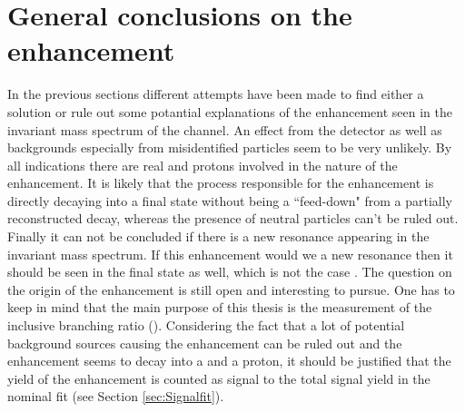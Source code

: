\section{General conclusions on the enhancement}
In the previous sections different attempts have been made to find either a solution or rule out some potantial explanations of the enhancement seen in the invariant \Dz\proton mass spectrum of the \LbToDpmunuX channel.
An effect from the detector as well as backgrounds especially from misidentified particles seem to be very unlikely.
By all indications there are real \Dz and protons involved in the nature of the enhancement.
It is likely that the process responsible for the enhancement is directly decaying into a \Dz\proton final state without being a ``feed-down" from a partially reconstructed decay, whereas the presence of neutral particles can't be ruled out.
Finally it can not be concluded if there is a new resonance appearing in the invariant \Dz\proton mass spectrum.
If this enhancement would we a new \Lc resonance then it should be seen in the \Lc\pip\pim final state as well, which is not the case \cite{PDG}.
The question on the origin of the enhancement is still open and interesting to pursue.
One has to keep in mind that the main purpose of this thesis is the measurement of the inclusive branching ratio \BR(\LbToDpmunuX). 
Considering the fact that a lot of potential background sources causing the enhancement can be ruled out and the enhancement seems to decay into a \Dz and a proton, it should be justified that the yield of the enhancement is counted as signal to
the total signal yield \NDp in the nominal fit (see Section \ref{sec:Signalfit}). 
